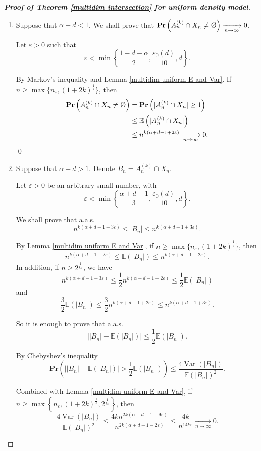 \documentclass{article}
\DeclareMathOperator{\Var}{Var}
\newcommand{\vide}{\textup{\O}}
\newcommand{\tendvers}{\xrightarrow[n\to\infty]{}}
\def\Pr{\mathbf{Pr}}
\newcommand\esp[1]{\mathbb{E}\left( #1 \right)}
\theoremstyle{remark}
\begin{document}
\begin{proof}[\textbf{Proof of Theorem \ref{multidim intersection} for uniform density model}]\quad
\begin{enumerate}[$(i)$]
    \item Suppose that $\alpha+d<1$. We shall prove that $\Pr\left(A_n^{(k)}\cap X_n \neq \vide\right)\tendvers 0$.
    
    Let $\varepsilon>0$ such that
    \[\varepsilon<\min\left\{\frac{1-d-\alpha}{2}, \frac{\varepsilon_0(d)}{10}, d\right\}.\]
    
    By Markov's inequality and Lemma \ref{multidim uniform E and Var}. If $n \geq \max\{n_\varepsilon,(1+2k)^{\frac{1}{\varepsilon}}\}$, then
    \[\begin{split}\Pr\left(A_n^{(k)}\cap X_n \neq \vide\right) & = \Pr\left(|A_n^{(k)}\cap X_n| \geq 1\right)\\
    & \leq \esp{|A_n^{(k)}\cap X_n|}\\
    & \leq n^{k(\alpha+d-1+2\varepsilon)}\tendvers 0.
    \end{split}\]\qed
    
    \item Suppose that $\alpha+d>1$. Denote $B_n =  A_n^{(k)}\cap X_n$.
    
    Let $\varepsilon>0$ be an arbitrary small number, with     \[\varepsilon<\min\left\{\frac{\alpha+d-1}{3}, \frac{\varepsilon_0(d)}{10}, d\right\}.\]

    We shall prove that a.a.s.
    \[n^{k(\alpha+d-1-3\varepsilon)} \leq |B_n| \leq n^{k(\alpha+d-1+3\varepsilon)}.\]
    
    By Lemma \ref{multidim uniform E and Var}, if $n \geq \max\{n_\varepsilon,(1+2k)^{\frac{1}{\varepsilon}}\}$, then
    \begin{align*} n^{k(\alpha+d-1-2\varepsilon)} \leq \esp{|B_n|} \leq n^{k(\alpha+d-1+2\varepsilon)}.
    \end{align*}
    In addition, if $n\geq 2^{\frac{1}{k\varepsilon}}$, we have
    \[n^{k(\alpha+d-1-3\varepsilon)} \leq \frac{1}{2}n^{k(\alpha+d-1-2\varepsilon)} \leq \frac{1}{2}\esp{|B_n|}\]
    and 
    \[\frac{3}{2}\esp{|B_n|} \leq \frac{3}{2}n^{k(\alpha+d-1+2\varepsilon)} \leq n^{k(\alpha+d-1+3\varepsilon)}.\]

    So it is enough to prove that a.a.s.
    \[\left||B_n|-\esp{|B_n|}\right| \leq \frac{1}{2}\esp{|B_n|}.\]
   
    By Chebyshev's inequality
    \[\Pr\left(\left||B_n|-\esp{|B_n|}\right| > \frac{1}{2}\esp{|B_n|}\right) \leq \frac{4\Var\left(|B_n|\right)}{\esp{|B_n|}^2}.\]

    Combined with Lemma \ref{multidim uniform E and Var}, if $n\geq \max\left\{ n_\varepsilon, (1+2k)^{\frac{1}{\varepsilon}}, 2^{\frac{1}{k\varepsilon}}\right\}$, then
    \[\frac{4\Var\left(|B_n|\right)}{\esp{|B_n|}^2}\leq \frac{4kn^{2k(\alpha+d-1-9\varepsilon)}}{n^{2k(\alpha+d-1-2\varepsilon)}} \leq \frac{4k}{n^{14k\varepsilon}} \tendvers 0.\]
\end{enumerate}
\end{proof}
\end{document}
